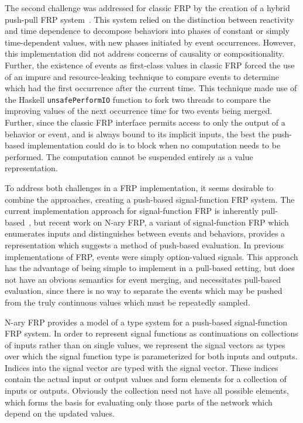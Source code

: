 The second challenge was addressed for classic FRP by the creation of a hybrid push-pull FRP system~\cite{Elliott2009}. This system relied
on the distinction between reactivity and time dependence to decompose behaviors into phases of constant or simply time-dependent values,
with new phases initiated by event occurrences. However, this implementation did not address concerns of causality or compositionality.
Further, the existence of events as first-class values in classic FRP forced the use of an impure and resource-leaking technique to compare
events to determine which had the first occurrence after the current time. This technique made use of the Haskell {\tt unsafePerformIO} function
to fork two threads to compare the improving values of the next occurrence time for two events being merged. Further, since the classic FRP
interface permits access to only the output of a behavior or event, and is always bound to its implicit inputs, the best the push-based implementation
could do is to block when no computation needs to be performed. The computation cannot be suspended entirely as a value representation.

To address both challenges in a FRP implementation, it seems desirable to combine the approaches, creating a push-based
signal-function FRP system. The current implementation approach for signal-function FRP is inherently pull-based~\cite{Nilsson2002}, but
recent work on N-ary FRP, a variant of signal-function FRP which enumerates inputs and distinguishes between events and behaviors, provides a representation which suggests
a method of push-based evaluation. In previous implementations of FRP, events were simply
option-valued signals. This approach has the advantage of being simple to implement in a pull-based setting, but does not have an obvious
semantics for event merging, and necessitates pull-based evaluation, since there is no way to separate the events which may be pushed from
the truly continuous values which must be repeatedly sampled.

N-ary FRP provides a model of a type system for a push-based signal-function FRP system. In order to represent signal functions
as continuations on collections of inputs rather than on single values, we represent the signal vectors as types over which
the signal function type is parameterized for both inputs and outputs. Indices into the signal vector are typed with the signal vector. These indices
contain the actual input or output values and form elements for a collection of inputs or outputs. Obviously the collection need not have all possible elements,
which forms the basis for evaluating only those parts of the network which depend on the updated values.